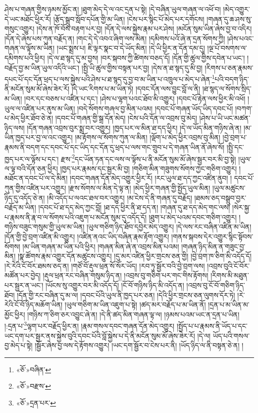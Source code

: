 ཤེས་པ་གཞན་གྱིས་ཉམས་མྱོང་ན། །ཐུག་མེད་དེ་ལ་འང་དྲན་པ་སྟེ། །དེ་བཞིན་ཡུལ་གཞན་ལ་འཕོ་བ། །མེད་འགྱུར་དེ་ཡང་མཐོང་ཕྱིར་རོ། །རྩོད་སྒྲུབ་སློབ་དཔོན་གྱི་མ་ཡིན། །ངེས་པར་སྙིང་པོ་མེད་པར་དགོངས། །གཞན་དུ་ཆ་ཤས་སུ་གསུང་འགྱུར། །དེས་ན་ཁོ་བོས་བརྟག་པར་བྱ། །དོན་དེ་ལས་སྐྱེས་རྣམ་པར་ཤེས། །མངོན་སུམ་ཡིན་ཞེས་བྱ་བ་འདིར། །དོན་དེ་ཞེས་པས་ཀུན་བརྗོད་ན། །གང་དེ་དེ་འབའ་ཞིག་ལས་མིན། །དམིགས་པའོ་ཞེ་ན་དྲན་སོགས་ཀྱི། །ཤེས་པའང་གཞན་ལ་ལྟོས་མ་ཡིན། །ཡང་སྨྲས་པ། ཇི་ལྟར་སྣང་བ་དེ་ཡོད་མིན། །དེ་ཡི་ཕྱིར་ན་དོན་དམ་དུ། །ལྔ་པོ་བསགས་ལ་དམིགས་པའི་ཕྱིར། །དེ་ལ་ཐ་སྙད་དུ་མ་བྱས། །བར་སྐབས་ཀྱི་ཚིགས་བཅད་དོ། །དོན་གྱི་ཚུལ་གྱིས་དབེན་པ་ཡང་། །བརྗོད་བྱ་མ་ཡིན་ཡུལ་འདིའི་ཡང་། །སྤྱི་ཡི་ཚུལ་གྱིས་བསྟན་པར་བྱ། །དེས་ན་ཐ་སྙད་དུ་མི་བྱ། །རིགས་པ་ཅན་རྣམས་དཔང་པོ་དང་དོན་ཕྲད་པ་ལས་སྐྱེས་པའི་ཤེས་པ་ཐ་སྙད་དུ་བྱ་བ་མ་ཡིན་པ་འཁྲུལ་པ་མེད་པ་ཞེན་\footnote{«ཅོ་»བཞིན་}པའི་བདག་ཉིད་ནི་མངོན་སུམ་མོ་ཞེས་ཟེར་རོ། །དེ་ཡང་རིགས་པ་མ་ཡིན་ཏེ། །དབང་དོན་ལས་བྱུང་བློ་ལ་ནི། །ཐ་སྙད་ལ་སོགས་སྲིད་མ་ཡིན། །བར་དང་བཅས་པ་འཛིན་པ་དང་། །ཤེས་པ་ལྷག་པའང་ཐོབ་མི་འགྱུར། །དབང་པོ་རྟེན་ལས་ཕྱིར་མི་འཕོ། །ཡུལ་ལ་འཛིན་པར་ནུས་མ་ཡིན། །བདེ་སོགས་གཞལ་བྱ་མིན་པའམ། །དབང་པོ་གཞན་ཡོད་ཡིད་དབང་པོ། །བཀག་པ་མེད་ཕྱིར་ཐོབ་ཅེ་ན། །དབང་པོ་གཞན་གྱི་སྒྲ་དོན་མེད། །ངེས་པའི་དོན་ལ་འབྲས་བུ་མེད། །ཤེས་པ་ཡི་ཡང་མཚན་ཉིད་ལས། །དོན་གཞན་འབྲས་བུར་སྨྲ་བར་འགྱུར། །ཁྱད་པར་ལ་མིན་ཐ་དད་ཕྱིར། །དེ་ལ་ཡོད་མིན་གཉིས་ཞེ་ན། །མ་ཡིན་ཁྱད་པར་བྱ་ལ་འང་འགྱུར། །མ་རྟོགས་ལ་སོགས་ཀུན་ལ་མིན། །ལྡོག་པ་མེད་ཕྱིར་འབྲས་བུ་མིན། །བྱེ་བྲག་པ་རྣམས་ནི་བདག་དང་དབང་པོ་དང་ཡིད་དང་དོན་དུ་ཕྲད་པ་ལས་གང་གྲུབ་པ་དེ་གཞན་ཡིན་ནོ་ཞེས་སོ། །སྤྱི་དང་ཁྱད་པར་ལ་ལྟོས་པ་དང་། རྫས་\footnote{«ཅོ་»བརྫས་}དང་ཡོན་ཏན་དང་ལས་ལ་ལྟོས་པ་ནི་མངོན་སུམ་མོ་ཞེས་སྦྱར་བར་མི་བྱ་སྟེ། །ཡུལ་ལ་ལྟ་བའི་དོན་ཅན་ཕྱིར། །ཁྱད་པར་རྣམས་དང་སྦྱར་མི་བྱ། །གཅིག་མིན་གཟུགས་སོགས་ཀྱང་གཅིག་འགྱུར། །མཐོང་ན་དབང་པོ་ལ་དེ་མིན། །དབང་གཞན་དོན་མེད་འགྱུར་ཕྱིར་རོ། །རང་ཡུལ་ཐ་དད་ཀྱང་འཛིན་ནུབ། །
དབང་པོ་ཀུན་གྱིས་འཛིན་པར་འགྱུར། །རྫས་སོགས་ལ་མིན་དེ་ལྟ་ན། །མེད་ཕྱིར་གཞན་གྱི་སྤྱོད་ཡུལ་མིན། །ཡུལ་མཚུངས་ཉིད་དུ་འདོད་ཅེ་ན། །མི་འདོད་པ་ལའང་ཐལ་བར་འགྱུར། །མ་ངེས་དེ་ནི་གཞན་དུ་བརྗོད། །ཐམས་ཅད་བསྒྲུབ་བྱར་བརྗོད་མ་ཡིན། །དབང་པོ་ཐ་དད་མེད་ཀྱང་བློ། །ཐ་དད་ཕྱིར་ནི་ཐ་དད་ན། །གཞན་དུ་ཐ་དད་མེད་གང་ལས། །སེར་སྐྱ་པ་རྣམས་ནི་རྣ་བ་ལ་སོགས་པའི་འཇུག་པ་མངོན་སུམ་དུ་འདོད་དོ། །ཐུག་པ་མེད་པའམ་དབང་གཅིག་འགྱུར། །གཉིས་བཟུང་གསུམ་གྱི་ཡུལ་མ་ཡིན། །ཡུལ་གཅིག་ཉིད་ཐོབ་དབྱེར་མེད་འགྱུར། །དེ་ལས་རང་བཞིན་འཛིན་མ་ཡིན། །དོན་གྱི་བྱེ་བྲག་འཛིན་མི་འགྱུར། །འཛིན་ནའང་ཡིད་བཞིན་རྣམ་རྟོག་འགྱུར། །གནས་སྐབས་དེར་འགྱུར་སྙིང་སྟོབས་སོགས། །མ་ཡིན་གཞན་མ་ཡིན་པའི་ཕྱིར། །གཞན་མིན་ཞེ་ན་འབྲས་མིན་པའམ། །གཞན་ཉིད་མིན་ན་གཟུང་བྱ་མིན། །སྣ་ཚོགས་རྣམ་འགྱུར་དོན་མཚུངས་འགྱུར། །དུ་མར་འཛིན་ཕྱིར་གྲངས་ཅན་གྱི། །བྱེ་བྲག་ཁ་ཅིག་མི་འདོད་དོ། །རེ་རེའི་ངོ་བོར་ཐམས་ཅད་ན། །གཙོ་བོ་རྡུལ་ཕྲན་སོ་སོར་ཡོད། །རབ་ཏུ་སྦྱོར་བའི་བྱེ་བྲག་ལས། །འབྲས་བུའི་ངོ་བོར་མཚོན་པར་བྱེད། །རྡུལ་ཕྲན་རང་བཞིན་གསུམ་ཉིད་ན། །འབྲས་བུ་གཅིག་པར་གང་གིས་རྟོགས། །རིགས་མི་མཐུན་པར་སྦྱར་ན་ཡང་། །ཡོངས་སུ་འགྱུར་བར་མི་འདོད་དོ། །ངོ་བོ་གཉིས་ཉིད་མི་འདོད་ན། །འབྲས་བུ་ངོ་བོ་གཅིག་ཉིད་ཐོབ། །དོན་གྱི་རང་བཞིན་དུ་མ་ལ། །དབང་པོའི་ཡུལ་ནི་ཁྱད་པར་ཅན། །དེའི་ཕྱིར་གྲངས་ཅན་ལུགས་དོར་ཏེ། །རེ་རེའི་ངོ་བོ་ཉིད་མཆོག་ཡིན། །ཡུལ་གཅིག་མ་ཡིན་འཇུག་པ་སྟེ། །ཚད་མར་བརྗོད་པ་མ་ཡིན་ནོ། །དྲན་པ་མ་ཡིན་མ་མྱོང་ཕྱིར། །གཉིས་ཀ་ཅིག་ཅར་འབྱུང་ཞེ་ན། །དེ་ནི་ཚད་མིན་གཞན་ལྟ་ལ། །ཉམས་པའམ་ཡང་ན་དྲན་པ་ཡིན། །:དྲན་པ་\footnote{«ཅོ་»དྲན་པར་}ལྷག་པར་བརྗོད་ཕྱིར་ན། །རྣམ་གསལ་དབང་གཞན་དོན་མེད་འགྱུར། །སྤྱོད་པ་པ་རྣམས་ནི་ཡོད་པ་དང་ཡང་དག་པར་སྦྱར་ནས་སྐྱེས་བུའི་དབང་པོའི་བློ་སྐྱེས་པ་དེ་ནི་མངོན་སུམ་མོ་ཞེས་ཟེར་རོ། །དེ་ལ། ཡོད་པའི་གསལ་བྱ་མེད་པ་སྟེ། །སྦྱོར་ཞེས་བྱ་ལས་དེ་རྟོགས་འགྱུར། །ཡང་དག་སྦྱོར་བ་ངེས་པར་ནི། །ཡོད་ཉིད་ལ་ནི་བསྟན་ཅེ་ན། །
